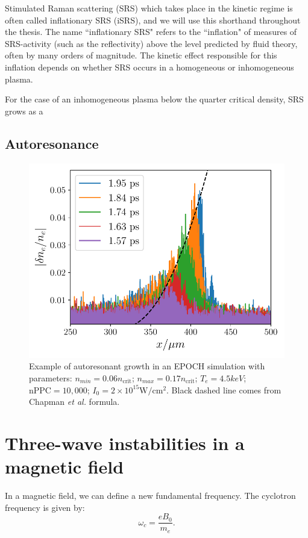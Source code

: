 Stimulated Raman scattering (\acrshort{SRS}) which takes place in the kinetic regime is often called inflationary SRS (\acrshort{iSRS}), and we will use this shorthand throughout the thesis. The name ``inflationary SRS" refers to the ``inflation" of measures of SRS-activity (such as the reflectivity) above the level predicted by fluid theory, often by many orders of magnitude. The kinetic effect responsible for this inflation depends on whether SRS occurs in a homogeneous or inhomogeneous plasma.

For the case of an inhomogeneous plasma below the quarter critical density, SRS grows as a 




\subsection{Autoresonance}

\begin{figure}[ht]
    \centering
    \includegraphics[width=0.8\columnwidth]{Chapters/C2_Theory/AR_diagnostic.pdf}
    \caption{Example of autoresonant growth in an EPOCH simulation with parameters: $n_{min} = 0.06 n_{\text{crit}}$; $n_{max} = 0.17 n_{\text{crit}}$; $T_e = 4.5\si{keV}$; $\text{nPPC}=10,000$; $I_0 = 2 \times 10^{15}\si{\watt / \centi\metre^2}$. Black dashed line comes from Chapman \textit{et al.} \citep{Chapman2012} formula.}
    \label{fig:AR_diagnostic}
\end{figure}{}


\section{Three-wave instabilities in a magnetic field}

In a magnetic field, we can define a new fundamental frequency. The cyclotron frequency is given by:
\begin{equation}
\omega_c = \frac{eB_0}{m_e}.
\end{equation}

